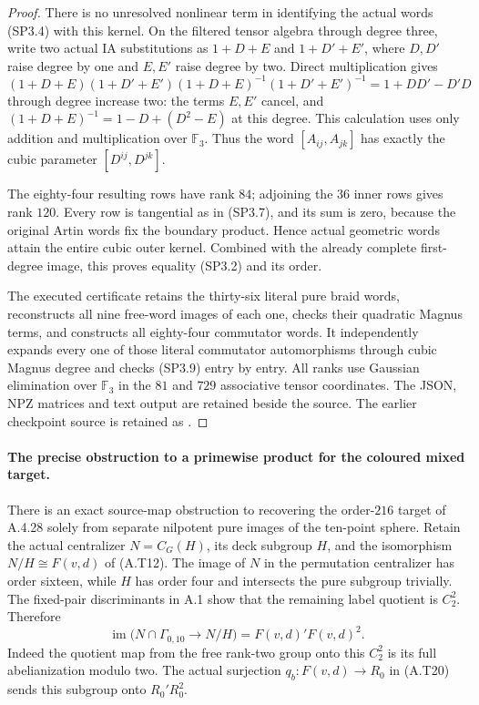 \begin{proof}
There is no unresolved nonlinear term in identifying the
actual words (SP3.4) with this kernel.  On the filtered tensor
algebra through degree three, write two actual IA substitutions
as $1+D+E$ and $1+D'+E'$, where $D,D'$ raise degree by one
and $E,E'$ raise degree by two.  Direct multiplication gives
\[
 (1+D+E)(1+D'+E')(1+D+E)^{-1}(1+D'+E')^{-1}
        =1+DD'-D'D                                      \tag{SP3.9}
\]
through degree increase two: the terms $E,E'$ cancel, and
$(1+D+E)^{-1}=1-D+(D^2-E)$ at this degree.  This calculation
uses only addition and multiplication over $\mathbb F_3$.
Thus the word $[A_{ij},A_{jk}]$ has exactly the cubic
parameter $[D^{ij},D^{jk}]$.

The eighty-four resulting rows have rank $84$; adjoining the
$36$ inner rows gives rank $120$.  Every row is tangential
as in (SP3.7), and its sum is zero, because the original Artin
words fix the boundary product.  Hence actual geometric words
attain the entire cubic outer kernel.  Combined with the
already complete first-degree image, this proves equality
(SP3.2) and its order.

The executed certificate
retains the thirty-six literal pure braid words, reconstructs all
nine free-word images of each one, checks their quadratic
Magnus terms, and constructs all eighty-four commutator words.
It independently expands every one of those literal
commutator automorphisms through cubic Magnus degree and
checks (SP3.9) entry by entry.  All ranks use Gaussian
elimination over $\mathbb F_3$ in the $81$ and $729$
associative tensor coordinates.  The JSON, NPZ matrices and
text output are retained beside the source.  The earlier
checkpoint source is retained as
.
\end{proof}

\paragraph{The precise obstruction to a primewise product for the coloured mixed target.}
There is an exact source-map obstruction to recovering the
order-$216$ target of A.4.28 solely from separate nilpotent
pure images of the ten-point sphere.  Retain the actual
centralizer $N=C_G(H)$, its deck subgroup $H$, and the
isomorphism $N/H\cong F(v,d)$ of (A.T12).
The image of $N$ in the permutation centralizer has order
sixteen, while $H$ has order four and intersects the pure
subgroup trivially.  The fixed-pair discriminants in A.1 show
that the remaining label quotient is $C_2^2$.  Therefore
\[
 \operatorname{im}\bigl(N\cap\Gamma_{0,10}\to N/H\bigr)
                  =F(v,d)'F(v,d)^2.                    \tag{SP3.10}
\]
Indeed the quotient map from the free rank-two group onto
this $C_2^2$ is its full abelianization modulo two.
The actual surjection $q_b:F(v,d)\to R_0$ in (A.T20) sends
this subgroup onto $R_0'R_0^2$.


